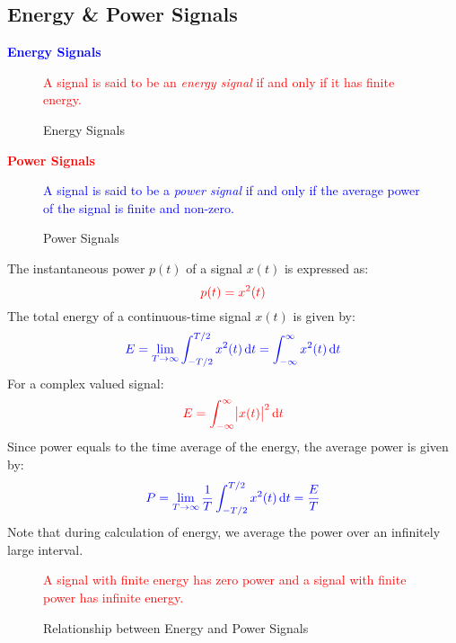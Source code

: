 \documentclass[../notes-main.tex]{subfiles}
\begin{document}
\subsection{Energy \& Power Signals}
\textcolor{blue}{\textbf{Energy Signals}}
\vspace{-1em}
\begin{figure}[H]
    \centering
    \begin{mdframed}
        \begin{center}
            \textcolor{red}{%
                A signal is said to be an \emph{energy signal} if and only if it has finite energy.}
        \end{center}
    \end{mdframed}\label{fig:energy-signal-def-1}
    \vspace{-1em}\caption{Energy Signals}
\end{figure}
\vspace{-1em}
\noindent \textcolor{red}{\textbf{Power Signals}}
\vspace{-1em}
\begin{figure}[H]
    \centering
    \begin{mdframed}
        \begin{center}
            \textcolor{blue}{%
                A signal is said to be a \emph{power signal} if and only if the average power of the signal is finite and non-zero.}
        \end{center}
    \end{mdframed}\label{fig:power-signal-def-1}
    \vspace{-1em}\caption{Power Signals}
\end{figure}
\vspace{-1em}
\noindent The instantaneous power \(p(t)\) of a signal \(x(t)\) is expressed as:
\[
    \textcolor{red}{p(t) = x^2(t)}
\]
The total energy of a continuous-time signal \(x(t)\) is given by:
\[
    \textcolor{blue}{E = \lim_{T \to \infty} \int_{-T/2}^{T/2} x^2(t) \dif t = \int_{-\infty}^{\infty} x^2(t) \dif t}
\]
For a complex valued signal:
\[
    \textcolor{red}{E = \int_{-\infty}^{\infty} \abs{x(t)}^2 \dif t}
\]
Since power equals to the time average of the energy, the average power is given by:
\[
    \textcolor{blue}{P = \lim_{T \to \infty} \frac{1}{T} \int_{-T/2}^{T/2} x^2(t) \dif t = \frac{E}{T}}
\]
\newpage
\noindent Note that during calculation of energy, we average the power over an infinitely large interval.
\begin{figure}[H]
    \centering
    \begin{mdframed}
        \begin{center}
            \textcolor{red}{%
                A signal with finite energy has zero power and a signal with finite power has infinite energy.}
        \end{center}
    \end{mdframed}\label{fig:energy-power-relationship-1}
    \vspace{-1em}\caption{Relationship between Energy and Power Signals}
\end{figure}
\end{document}
